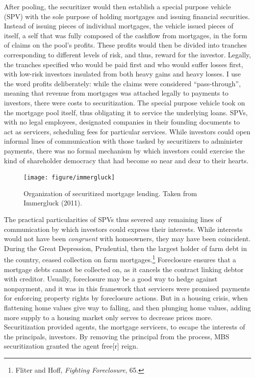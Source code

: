 \documentclass[12pt,oneside]{psthesis}
\begin{document}
After pooling, the securitizer would then establish a special purpose vehicle (SPV) with the sole purpose of holding mortgages and issuing financial securities.
Instead of issuing pieces of individual mortgages, the vehicle issued pieces of itself, a self that was fully composed of the cashflow from mortgages, in the form of claims on the pool's profits.
These profits would then be divided into tranches corresponding to different levels of risk, and thus, reward for the investor.
Legally, the tranches specified who would be paid first and who would suffer losses first, with low-risk investors insulated from both heavy gains and heavy losses.
I use the word profits deliberately: while the claims were considered ``pass-through'', meaning that revenue from mortgages was attached legally to payments to investors, there were costs to securitization.
The special purpose vehicle took on the mortgage pool itself, thus obligating it to service the underlying loans.
SPVs, with no legal employees, designated companies in their founding documents to act as servicers, scheduling fees for particular services.
While investors could open informal lines of communication with those tasked by securitizers to administer payments, there was no formal mechanism by which investors could exercise the kind of shareholder democracy that had become so near and dear to their hearts.
\begin{figure}

{\centering \texttt{[image: figure/immergluck]} 

}

\caption{Organization of securitized mortgage lending. Taken from Immergluck (2011).}\label{fig:immergluck}
\end{figure}
The practical particularities of SPVs thus severed any remaining lines of communication by which investors could express their interests.
While interests would not have been \emph{congruent} with homeowners, they may have been coincident.
During the Great Depression, Prudential, then the largest holder of farm debt in the country, ceased collection on farm mortgages.\footnote{Fliter and Hoff, \emph{Fighting Foreclosure}, 65.}
Foreclosure ensures that a mortgage debts cannot be collected on, as it cancels the contract linking debtor with creditor.
Usually, foreclosure may be a good way to hedge against nonpayment, and it was in this framework that servicers were promised payments for enforcing property rights by foreclosure actions.
But in a housing crisis, when flattening home values give way to falling, and then plunging home values, adding more supply to a housing market only serves to decrease prices more.
Securitization provided agents, the mortgage servicers, to escape the interests of the principals, investors.
By removing the principal from the process, MBS securitization granted the agent free{[}r{]} reign.
\end{document}

